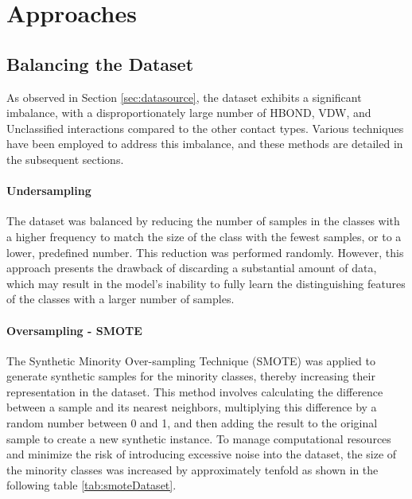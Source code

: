\documentclass[10pt,twocolumn,letterpaper]{article}
\begin{document}

\section{Approaches}
\subsection{Balancing the Dataset}
As observed in Section \ref{sec:datasource}, the dataset exhibits a significant imbalance, with a disproportionately large number of HBOND, VDW, and Unclassified interactions compared to the other contact types. 
Various techniques have been employed to address this imbalance, and these methods are detailed in the subsequent sections.
\paragraph{Undersampling}
The dataset was balanced by reducing the number of samples in the classes with a higher frequency to match the size of the class with the fewest samples, or to a lower, predefined number. 
This reduction was performed randomly. However, this approach presents the drawback of discarding a substantial amount of data, which may result in the model's inability to fully learn the distinguishing features of the classes with a larger number of samples.

\paragraph{Oversampling - SMOTE}
The Synthetic Minority Over-sampling Technique (SMOTE)\cite{chawla2002smote} was applied to generate synthetic samples for the minority classes, thereby increasing their representation in the dataset. 
This method involves calculating the difference between a sample and its nearest neighbors, multiplying this difference by a random number between 0 and 1, and then adding the result to the original sample to create a new synthetic instance. 
To manage computational resources and minimize the risk of introducing excessive noise into the dataset, the size of the minority classes was increased by approximately tenfold as shown in the
following table \ref{tab:smoteDataset}.
\end{document}
